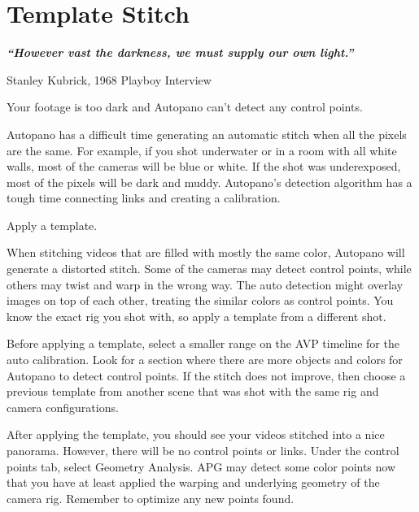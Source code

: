 \chapter{Template Stitch}
\pagecolor{white}
\label{chap:40}
\begin{fullwidth}

{\itshape\bfseries “However vast the darkness, we must supply our own light.”}

Stanley Kubrick, 1968 Playboy Interview
\vspace{\baselineskip}

\problem

{\large Your footage is too dark and Autopano can’t detect any control points. \par}

Autopano has a difficult time generating an automatic stitch when all the pixels are the same. For example, if you shot underwater or in a room with all white walls, most of the cameras will be blue or white. If the shot was underexposed, most of the pixels will be dark and muddy. Autopano’s detection algorithm has a tough time connecting links and creating a calibration.

\solutions

{\large Apply a template. \par}

When stitching videos that are filled with mostly the same color, Autopano will generate a distorted stitch. Some of the cameras may detect control points, while others may twist and warp in the wrong way. The auto detection might overlay images on top of each other, treating the similar colors as control points. You know the exact rig you shot with, so apply a template from a different shot.


Before applying a template, select a smaller range on the AVP timeline for the auto calibration. Look for a section where there are more objects and colors for Autopano to detect control points. If the stitch does not improve, then choose a previous template from another scene that was shot with the same rig and camera configurations. 


After applying the template, you should see your videos stitched into a nice panorama. However, there will be no control points or links. Under the control points tab, select Geometry Analysis. APG may detect some color points now that you have at least applied the warping and underlying geometry of the camera rig. Remember to optimize any new points found.


\end{fullwidth}
